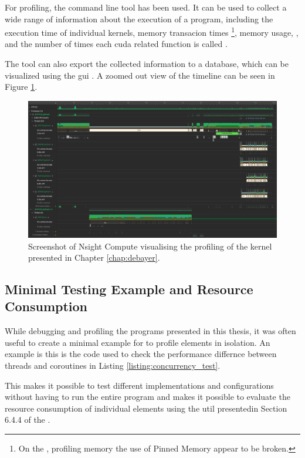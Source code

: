 For profiling, the  command line tool has been used.
It can be used to collect a wide range of information about the execution of a program, including the execution time of individual kernels, memory transacion times \footnote{On the \jx, profiling memory the use of Pinned Memory appear to be broken.}, memory usage,
, and the number of times each cuda related function is called \cite{nvidiaNVIDIANsightSystems2023}.

The  tool can also export the collected information to a  database, which can be visualized using the  \gls{gui} \cite{nvidiaNVIDIANsightSystems2023}.
A zoomed out view of the timeline can be seen in Figure \ref{fig:nsight_timeline}.

\begin{figure}[H]
    \centering
    \includegraphics[width=\textwidth]{figures/cuda/nsys_overall.png}
    \caption{Screenshot of Nsight Compute visualising the profiling of the kernel presented in Chapter \ref{chap:debayer}.}
    \label{fig:nsight_timeline}
\end{figure}

\subsection{Minimal Testing Example and Resource Consumption}
While debugging and profiling the programs presented in this thesis, it was often useful to create a minimal example for to profile elements in isolation.
An example is this is the code used to check the performance differnce between threads and coroutines in Listing \ref{listing:concurrency_test}.

This makes it possible to test different implementations and configurations without having to run the entire program and makes it possible to evaluate the resource consumption of individual elements using the  util presentedin Section 6.4.4 of the \preproject.

